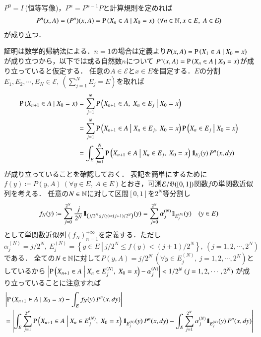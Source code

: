 	$P^0=I\ $(恒等写像)，$P^n=P^{n-1}P$と計算規則を定めれば
	\begin{align}
		P^n(x,A)=(P^n)(x,A)=\operatorname{P} \left( X_n \in A \ \middle|\ X_0 = x \right)\ (\forall n \in \mathbb{N}, x \in E,\ A \in \mathcal{E})
	\end{align}
	が成り立つ．
	
	\begin{prf}
		証明は数学的帰納法による．$n=1$の場合は定義より$P(x,A) = \operatorname{P} \left( X_1 \in A \ \middle|\ X_0 = x \right)$が成り立つから，以下では或る自然数$n$について
		$P^n(x,A) = \operatorname{P} \left( X_n \in A \ \middle|\ X_0 = x \right)$が成り立っていると仮定する．
		任意の$A \in \mathcal{E}$と$x \in E$を固定する．$E$の分割$E_1,E_2,\cdots,E_N \in \mathcal{E},\ (\sum_{j=1}^{N}E_j = E)$を取れば
		\begin{align}
			\cprob{X_{n+1} \in A}{X_0 = x} &= \sum_{j=1}^{N} \cprob{X_{n+1} \in A,\ X_n \in E_j}{X_0 = x} \\
			&= \sum_{j=1}^{N} \cprob{X_{n+1} \in A}{X_n \in E_j,\ X_0 = x}\cprob{X_n \in E_j}{X_0 = x} \\
			&= \int_{E} \sum_{j=1}^{N} \cprob{X_{n+1} \in A}{X_n \in E_j,\ X_0 = x} \defunc_{E_j}(y)\, P^n(x, dy)
		\end{align}
		が成り立っていることを確認しておく．
		表記を簡単にするために$f(y) \coloneqq P(y,A)\ (\forall y \in E,\ A \in E)$とおき，可測$\mathcal{E}/\mathfrak{B}([0,1])$関数$f$の単関数近似列を考える．
		任意の$N \in \mathbb{N}$に対して区間$[0,1]$を$2^N$等分割し
		\begin{align}
			f_N(y) \coloneqq \sum_{j = 0}^{2^N} \frac{j}{2^N} \mbox{1}\hspace{-0.25em}\mbox{l}_{\left( j/2^N \leq f(y) < (j+1)/2^N \right)} (y) = \sum_{j = 0}^{2^N} \alpha^{(N)}_j \mbox{1}\hspace{-0.25em}\mbox{l}_{E^{(N)}_j} (y) 
			\quad (y \in E)
		\end{align}
		として単関数近似列$(f_N)_{n=1}^{+\infty}$を定義する．ただし$\alpha^{(N)}_j = j/2^N,\ E^{(N)}_j = \left\{ y \in E\ \left|\ j/2^N \leq f(y) < (j+1)/2^N \right.\right\},\ (j=1,2,\cdots,2^N)$である．
		全ての$N \in \mathbb{N}$に対して$P(y, A) = j / 2^N\ (\forall y \in E^{(N)}_j,\ j=1,2,\cdots,2^N)$としているから
		$\left| \cprob{X_{n+1} \in A}{X_n \in E^{(N)}_j,\ X_0 = x} - \alpha^{(N)}_j \right| < 1/2^N\ (j=1,2,\cdots,2^N)$
		が成り立っていることに注意すれば
		\begin{align}
			&\left| \cprob{X_{n+1} \in A}{X_0 = x} - \int_{E} f_N(y)\, P^n(x,dy) \right| \\
			&= \left| \int_{E} \sum_{j=1}^{2^N} \cprob{X_{n+1} \in A}{X_n \in E^{(N)}_j,\ X_0 = x} \defunc_{E^{(N)}_j}(y)\, P^n(x, dy) - \int_{E} \sum_{j=1}^{2^N} \alpha^{(N)}_j \defunc_{E^{(N)}_j}(y)\, P^n(x, dy) \right| \\

\end{align}
\end{prf}

